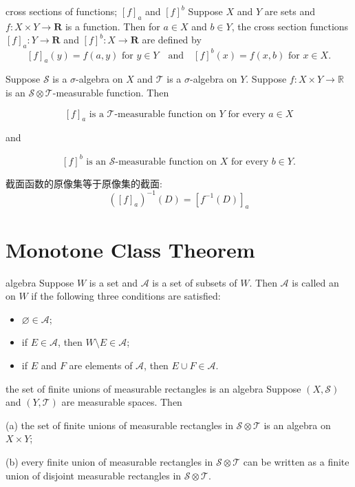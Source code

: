 \documentclass[../main.tex]{subfiles}
\begin{document}
\begin{definition}{cross sections of functions; $[f]_a$ and $[f]^b$}{}
Suppose $X$ and $Y$ are sets and $f:X\times Y\to\mathbf{R}$ is a function. Then for $a\in X$ and $b\in Y$, the cross section functions $[f]_a:Y\to\mathbf{R}$ and $[f]^b:X\to\mathbf{R}$ are defined by
\[
[f]_a(y)=f(a,y)\text{ for }y\in Y\quad\text{and}\quad [f]^b(x)=f(x,b)\text{ for }x\in X.
\]
\end{definition}
\begin{proposition}{}{}
Suppose \(\mathcal{S}\) is a \(\sigma\)-algebra on \(X\) and \(\mathcal{T}\) is a \(\sigma\)-algebra on \(Y\). Suppose \(f:X\times Y\to\mathbb{R}\) is an \(\mathcal{S}\otimes\mathcal{T}\)-measurable function. Then

\[[f]_a\text{ is a }\mathcal{T}\text{-measurable function on }Y\text{ for every }a\in X\]

and

\[[f]^b\text{ is an }\mathcal{S}\text{-measurable function on }X\text{ for every }b\in Y.\]
\end{proposition}

\begin{proofsketch}
  截面函数的原像集等于原像集的截面: \[
  \left( [f]_{a} \right)^{-1} \left( D \right)= [f^{-1} \left( D \right) ]_{a}  
  \] 
\end{proofsketch}

\section{Monotone Class Theorem}
\begin{definition}{algebra}{}
Suppose \(W\) is a set and \(\mathcal{A}\) is a set of subsets of \(W\). Then \(\mathcal{A}\) is called an  on \(W\) if the following three conditions are satisfied:

\begin{itemize}
  \item \(\varnothing \in \mathcal{A}\);
  \item if \(E \in \mathcal{A}\), then \(W \setminus E \in \mathcal{A}\);
  \item if \(E\) and \(F\) are elements of \(\mathcal{A}\), then \(E \cup F \in \mathcal{A}\).
\end{itemize}
\end{definition}
\begin{proposition}{the set of finite unions of measurable rectangles is an algebra}{}
Suppose \((X,\mathcal{S})\) and \((Y,\mathcal{T})\) are measurable spaces. Then

(a) the set of finite unions of measurable rectangles in \(\mathcal{S}\otimes\mathcal{T}\) is an algebra on \(X\times Y\);

(b) every finite union of measurable rectangles in \(\mathcal{S}\otimes\mathcal{T}\) can be written as a finite union of disjoint measurable rectangles in \(\mathcal{S}\otimes\mathcal{T}\).
\end{proposition}
\end{document}
